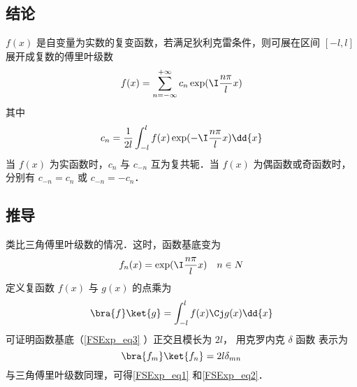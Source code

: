 
\subsection{结论}

$f(x)$ 是自变量为实数的复变函数，若满足狄利克雷条件，则可展在区间 $[ - l,l]$ 展开成复数的傅里叶级数
 \begin{equation}\label{FSExp_eq1}
f(x) = \sum_{n =  - \infty }^{ + \infty } c_n \exp ( \I\frac{n\pi }{l}x )
\end{equation}
其中
 \begin{equation}\label{FSExp_eq2}
{c_n} = \frac{1}{2l}\int_{ - l}^l  f(x)\exp( -\I\frac{n\pi }{l}x ) \dd{x} 
\end{equation}
当 $f(x)$ 为实函数时，$c_n$ 与 $c_{-n}$ 互为复共轭．当 $f(x)$ 为偶函数或奇函数时，分别有 $c_{-n} = c_n$ 或 $c_{-n} = -c_n$．

\subsection{推导}
类比三角傅里叶级数的情况．这时，函数基底变为
 \begin{equation}\label{FSExp_eq3}
{f_n}(x) = \exp( \I\frac{n\pi }{l}x ) \quad{n \in N}
\end{equation} 
定义复函数 $f(x)$ 与 $g(x)$ 的点乘为
\begin{equation}
\bra{f}\ket{g} = \int_{-l}^{l}  f(x)\Cj g(x) \dd{x}
\end{equation}
可证明函数基底（\autoref{FSExp_eq3} ）正交且模长为 $2l$， 用克罗内克 $\delta$ 函数%
表示为
\begin{equation}
\bra{f_m}\ket{f_n} = 2l \delta _{mn}
\end{equation}      
与三角傅里叶级数同理，可得\autoref{FSExp_eq1} 和\autoref{FSExp_eq2}．

